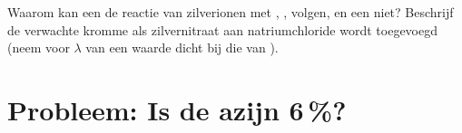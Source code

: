 \begin{exercise}[$\star\star\star$]\label{exo:g12:ph-conductivity-titrations:15}
Waarom kan een  de reactie van zilverionen met
, , volgen, en een  niet? Beschrijf de verwachte kromme als zilvernitraat aan
natriumchloride wordt toegevoegd (neem voor $\lambda$ van  een
waarde dicht bij die van ).
\end{exercise}

\section{Probleem: Is de azijn 6\,\%?}

